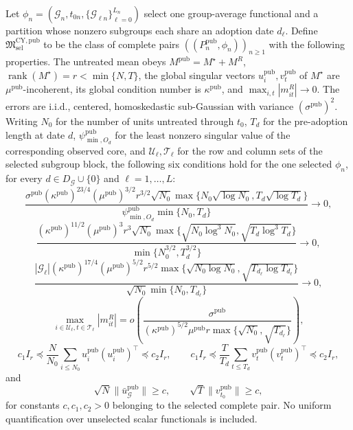 Let \(\phi_n=(\mathcal G_n,t_{0n},
\{\mathcal G_{\ell n}\}_{\ell=0}^{L_n})\) select one group-average
functional and a partition whose nonzero subgroups each share an adoption
date \(d_\ell\).  Define \(\mathfrak M^{\mathrm{CY,pub}}_{\mathrm{sel}}\)
to be the class of complete pairs \(((P_n^{\mathrm{pub}},\phi_n))_{n\ge1}\)
with the following properties.  The untreated mean obeys
\(M^{\mathrm{pub}}=M^\star+M^R\),
\(\operatorname{rank}(M^\star)=r<\min\{N,T\}\), the global singular
vectors \(u_i^{\mathrm{pub}},v_t^{\mathrm{pub}}\) of \(M^\star\) are
\(\mu^{\mathrm{pub}}\)-incoherent, its global condition number is
\(\kappa^{\mathrm{pub}}\), and
\(\max_{i,t}|m^R_{it}|\to0\).  The errors are i.i.d., centered,
homoskedastic sub-Gaussian with variance \((\sigma^{\mathrm{pub}})^2\).  Writing \(N_0\)
for the number of units untreated through \(t_0\), \(T_d\) for the
pre-adoption length at date \(d\), \(\psi^{\mathrm{pub}}_{\min,O_d}\) for the least
nonzero singular value of the corresponding observed core, and
\(\mathcal U_\ell,\mathcal T_\ell\) for the row and column sets of the
selected subgroup block, the following six conditions hold for the one
selected \(\phi_n\), for every \(d\in D_{\mathcal G}\cup\{0\}\) and
\(\ell=1,\ldots,L\):
\[
 \frac{\sigma^{\mathrm{pub}}(\kappa^{\mathrm{pub}})^{23/4}(\mu^{\mathrm{pub}})^{3/2}r^{3/2}\sqrt{N_0}
 \max\{N_0\sqrt{\log N_0},T_d\sqrt{\log T_d}\}}
 {\psi^{\mathrm{pub}}_{\min,O_d}\min\{N_0,T_d\}}\to0,
\]
\[
 \frac{(\kappa^{\mathrm{pub}})^{11/2}(\mu^{\mathrm{pub}})^3r^3\sqrt{N_0}
 \max\{\sqrt{N_0\log^3N_0},\sqrt{T_d\log^3T_d}\}}
 {\min\{N_0^{3/2},T_d^{3/2}\}}\to0,
\]
\[
 \frac{|\mathcal G_\ell|(\kappa^{\mathrm{pub}})^{17/4}(\mu^{\mathrm{pub}})^{5/2}r^{5/2}
 \max\{\sqrt{N_0\log N_0},\sqrt{T_{d_\ell}\log T_{d_\ell}}\}}
 {\sqrt{N_0}\min\{N_0,T_{d_\ell}\}}\to0,
\]
\[
 \max_{i\in\mathcal U_\ell,t\in\mathcal T_\ell}|m^R_{it}|
 =o\!\left(\frac{\sigma^{\mathrm{pub}}}
 {(\kappa^{\mathrm{pub}})^{5/2}\mu^{\mathrm{pub}}r\max\{\sqrt{N_0},\sqrt{T_{d_\ell}}\}}\right),
\]
\[
 c_1I_r\preceq\frac N{N_0}\sum_{i\le N_0}u_i^{\mathrm{pub}}(u_i^{\mathrm{pub}})^\top\preceq c_2I_r,
 \qquad
 c_1I_r\preceq\frac T{T_d}\sum_{t\le T_d}v_t^{\mathrm{pub}}(v_t^{\mathrm{pub}})^\top\preceq c_2I_r,
\]
and
\[
 \sqrt N\|\bar u^{\mathrm{pub}}_{\mathcal G}\|\ge c,
 \qquad \sqrt T\|v^{\mathrm{pub}}_{t_0}\|\ge c,
\]
for constants \(c,c_1,c_2>0\) belonging to the selected complete pair.
No uniform quantification over unselected scalar functionals is included.

